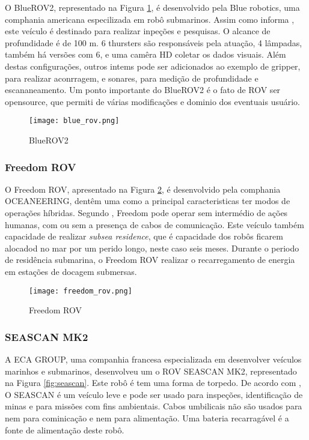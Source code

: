 O BlueROV2, representado na Figura \ref{fig:blue}, é desenvolvido pela Blue robotics, uma comphania americana especilizada em robô submarinos. Assim como informa \cite{Bluerobotics}, este veículo é destinado para realizar inpeções e pesquisas. O alcance de profundidade é de 100 m. 6 thursters são responsáveis pela atuação, 4 lâmpadas, também há versões com 6, e uma camêra HD coletar os dados visuais. 
Além destas configurações, outros intems pode ser adicionados ao exemplo de gripper, para realizar aconrragem, e sonares, para medição de profundidade e escananeamento. Um ponto importante do BlueROV2 é o fato de ROV ser opensource,  que permiti de várias modificações e dominio dos eventuais usuário.

\begin{figure}
  \centering 
  \texttt{[image: blue\_rov.png]}
  \caption{BlueROV2}
  \label{fig:blue}
\end{figure}

\subsubsection{Freedom ROV}


O Freedom ROV, apresentado na Figura \ref{fig:freedom_rov}, é desenvolvido pela comphania OCEANEERING, dentêm uma como a principal caracteristicas ter modos de operações híbridas. Segundo \cite{Bogue1}, Freedom pode operar sem intermédio de ações humanas, com ou sem a presença de cabos de comunicação. Este veículo também capacidade de realizar \textit{subsea residence}, que é capacidade dos robôs ficarem alocadod no mar por um perido longo, neste caso seis meses. Durante o periodo de residência submarina, o Freedom ROV realizar o recarregamento de energia em estações de docagem submersas.


\begin{figure}
  \centering 
  \texttt{[image: freedom\_rov.png]}
  \caption{Freedom ROV}
  \label{fig:freedom_rov}
\end{figure}

\subsubsection{SEASCAN MK2}


A ECA GROUP, uma companhia francesa especializada em desenvolver veículos marinhos e submarinos, desenvolveu um o ROV SEASCAN MK2, representado na Figura \ref{fig:seascan}. Este robô é tem uma forma de torpedo. De acordo com \cite{ECA_GROUP}, O SEASCAN é um veículo leve e pode ser usado para inspeções, identificação de minas e para missões com fins ambientais. Cabos umbilicais não são usados para nem para cominicação e nem para alimentação.  Uma bateria recarragável é a fonte de alimentação deste robô.


